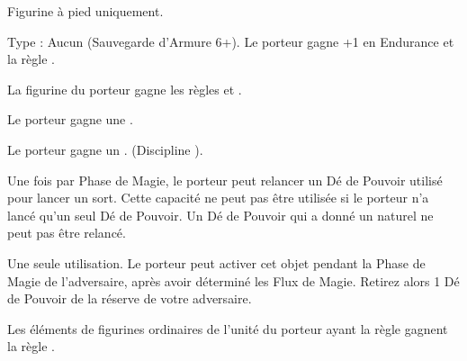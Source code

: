 \endpricelist

\armymagicalarmour

\startpricelist

Figurine à pied uniquement.

Type : Aucun (Sauvegarde d'Armure 6+). Le porteur gagne +1 en Endurance et la règle .
\endpricelist

\armytalismans

\startpricelist

La figurine du porteur gagne les règles \hardtarget{} et \fireborn{}.

\endpricelist

\armyenchanteditems

\startpricelist

Le porteur gagne une .

Le porteur gagne un . \whitemagicone{} (Discipline \whitemagic{}).

\endpricelist

\armyarcaneitems

\startpricelist

Une fois par Phase de Magie, le porteur peut relancer un Dé de Pouvoir utilisé pour lancer un sort. Cette capacité ne peut pas être utilisée si le porteur n'a lancé qu'un seul Dé de Pouvoir. Un Dé de Pouvoir qui a donné un  naturel ne peut pas être relancé.

Une seule utilisation. Le porteur peut activer cet objet pendant la Phase de Magie de l'adversaire, après avoir déterminé les Flux de Magie. Retirez alors 1 Dé de Pouvoir de la réserve de votre adversaire.

\endpricelist

\armymagicalbanners

\startpricelist

Les éléments de figurines ordinaires de l'unité du porteur ayant la règle \bornpredator{} gagnent la règle \hatred{}.

\endpricelist

